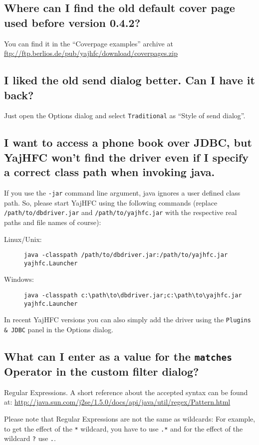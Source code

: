 \documentclass[a4paper,10pt]{scrartcl}
\begin{document}
\subsection{Where can I find the old default cover page used before version 0.4.2?}

You can find it in the ``Coverpage examples'' archive at \url{ftp://ftp.berlios.de/pub/yajhfc/download/coverpages.zip}

\subsection{I liked the old send dialog better. Can I have it back?}

Just open the Options dialog and select \texttt{Traditional} as ``Style of send dialog''.

\subsection{I want to access a phone book over JDBC, but YajHFC won't find the driver even if I specify a correct class path when invoking java.}

If you use the \texttt{-jar} command line argument, java ignores a user defined class path.
So, please start YajHFC using the following commands (replace \texttt{/path/to/dbdriver.jar} and \texttt{/path/to/yajhfc.jar} with the respective real paths and file names of course):
\begin{description}
\item [Linux/Unix:] \verb#java -classpath /path/to/dbdriver.jar:/path/to/yajhfc.jar yajhfc.Launcher#
\item [Windows:] \verb#java -classpath c:\path\to\dbdriver.jar;c:\path\to\yajhfc.jar yajhfc.Launcher#
\end{description}

In recent YajHFC versions you can also simply add the driver using the \texttt{Plugins \& JDBC} panel in the Options dialog.

\subsection{What can I enter as a value for the \texttt{matches} Operator in the custom filter dialog?}

Regular Expressions. A short reference about the accepted syntax can be found at:
\url{http://java.sun.com/j2se/1.5.0/docs/api/java/util/regex/Pattern.html}

Please note that Regular Expressions are not the same as wildcards: 
For example, to get the effect of the \verb.*. wildcard, you have to use \verb#.*# and 
for the effect of the wildcard \verb#?# use \verb#.#.
\end{document}
